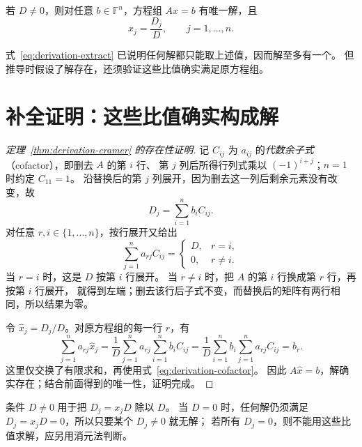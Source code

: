 \documentclass[UTF8,12pt,a4paper,fontset=fandol]{ctexart}
\begin{document}
\begin{theorem}[克拉默法则]
\label{thm:derivation-cramer}
若 $D\ne0$，则对任意 $b\in\mathbb F^n$，方程组 $Ax=b$ 有唯一解，且
\begin{equation}
  x_j=\frac{D_j}{D},\qquad j=1,\ldots,n.
  \label{eq:derivation-cramer}
\end{equation}
\end{theorem}

式~\eqref{eq:derivation-extract} 已说明任何解都只能取上述值，因而解至多有一个。
但推导时假设了解存在，还须验证这些比值确实满足原方程组。

\section{补全证明：这些比值确实构成解}

\begin{proof}[定理~\ref{thm:derivation-cramer} 的存在性证明]
记 $C_{ij}$ 为 $a_{ij}$ 的\emph{代数余子式}（cofactor），即删去 $A$ 的第 $i$ 行、
第 $j$ 列后所得行列式乘以 $(-1)^{i+j}$；$n=1$ 时约定 $C_{11}=1$。
沿替换后的第 $j$ 列展开，因为删去这一列后剩余元素没有改变，故
\[
  D_j=\sum_{i=1}^n b_iC_{ij}.
\]
对任意 $r,i\in\{1,\ldots,n\}$，按行展开又给出
\begin{equation}
  \sum_{j=1}^n a_{rj}C_{ij}
  =\begin{cases}D,&r=i,\\0,&r\ne i.\end{cases}
  \label{eq:derivation-cofactor}
\end{equation}
当 $r=i$ 时，这是 $D$ 按第 $i$ 行展开。
当 $r\ne i$ 时，把 $A$ 的第 $i$ 行换成第 $r$ 行，再按第 $i$ 行展开，
就得到左端；删去该行后子式不变，而替换后的矩阵有两行相同，所以结果为零。

令 $\widehat x_j=D_j/D$。对原方程组的每一行 $r$，有
\[
  \sum_{j=1}^n a_{rj}\widehat x_j
  =\frac1D\sum_{j=1}^n a_{rj}\sum_{i=1}^n b_iC_{ij}
  =\frac1D\sum_{i=1}^n b_i\sum_{j=1}^n a_{rj}C_{ij}
  =b_r.
\]
这里仅交换了有限求和，再使用式~\eqref{eq:derivation-cofactor}。
因此 $A\widehat x=b$，解确实存在；结合前面得到的唯一性，证明完成。
\end{proof}

条件 $D\ne0$ 用于把 $D_j=x_jD$ 除以 $D$。
当 $D=0$ 时，任何解仍须满足 $D_j=x_jD=0$，所以只要某个 $D_j\ne0$ 就无解；
若所有 $D_j=0$，则不能用这些比值求解，应另用消元法判断。
\end{document}
